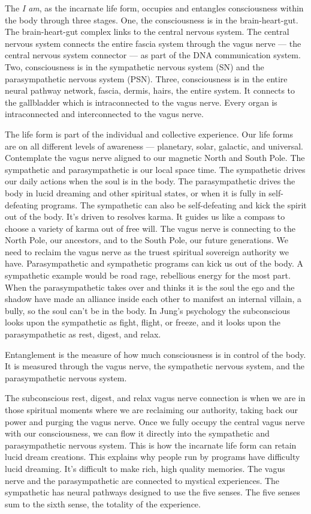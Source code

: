 The \emph{I am}, as the incarnate life form, occupies and entangles
consciousness within the body through three stages. One, the
consciousness is in the brain-heart-gut. The brain-heart-gut complex
links to the central nervous system. The central nervous system connects
the entire fascia system through the vagus nerve --- the central nervous
system connector --- as part of the DNA communication system. Two,
consciousness is in the sympathetic nervous system (SN) and the
parasympathetic nervous system (PSN). Three, consciousness is in the
entire neural pathway network, fascia, dermis, hairs, the entire system.
It connects to the gallbladder which is intraconnected to the vagus
nerve. Every organ is intraconnected and interconnected to the vagus
nerve.

The life form is part of the individual and collective experience. Our
life forms are on all different levels of awareness --- planetary,
solar, galactic, and universal. Contemplate the vagus nerve aligned to
our magnetic North and South Pole. The sympathetic and parasympathetic
is our local space time. The sympathetic drives our daily actions when
the soul is in the body. The parasympathetic drives the body in lucid
dreaming and other spiritual states, or when it is fully in
self-defeating programs. The sympathetic can also be self-defeating and
kick the spirit out of the body. It's driven to resolves karma. It
guides us like a compass to choose a variety of karma out of free will.
The vagus nerve is connecting to the North Pole, our ancestors, and to
the South Pole, our future generations. We need to reclaim the vagus
nerve as the truest spiritual sovereign authority we have.
Parasympathetic and sympathetic programs can kick us out of the body. A
sympathetic example would be road rage, rebellious energy for the most
part. When the parasympathetic takes over and thinks it is the soul the
ego and the shadow have made an alliance inside each other to manifest
an internal villain, a bully, so the soul can't be in the body. In
Jung's psychology the subconscious looks upon the sympathetic as fight,
flight, or freeze, and it looks upon the parasympathetic as rest,
digest, and relax.

Entanglement is the measure of how much consciousness is in control of
the body. It is measured through the vagus nerve, the sympathetic
nervous system, and the parasympathetic nervous system.

The subconscious rest, digest, and relax vagus nerve connection is when
we are in those spiritual moments where we are reclaiming our authority,
taking back our power and purging the vagus nerve. Once we fully occupy
the central vagus nerve with our consciousness, we can flow it directly
into the sympathetic and parasympathetic nervous system. This is how the
incarnate life form can retain lucid dream creations. This explains why
people run by programs have difficulty lucid dreaming. It's difficult to
make rich, high quality memories. The vagus nerve and the
parasympathetic are connected to mystical experiences. The sympathetic
has neural pathways designed to use the five senses. The five senses sum
to the sixth sense, the totality of the experience.

